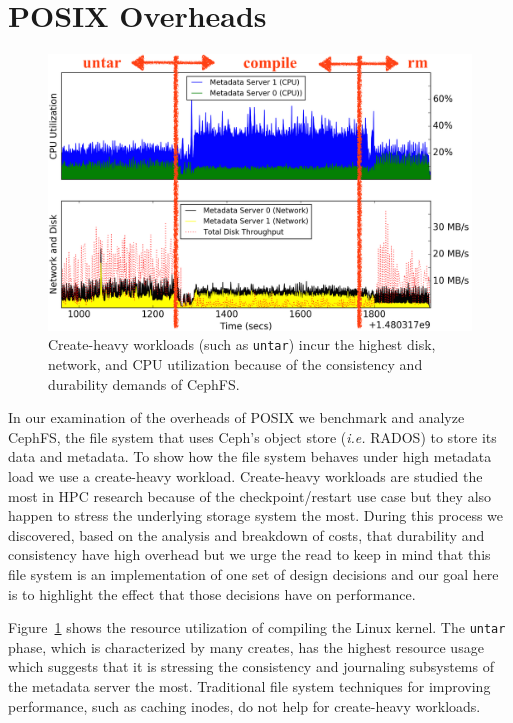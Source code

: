 \section{POSIX Overheads}
\label{sec:posix-overheads}

\begin{figure}[tb]
\centering
\includegraphics[width=1\linewidth]{./graphs/overhead-creates.png}
\caption{Create-heavy workloads (such as \texttt{untar}) incur the highest disk, network, and
CPU utilization because of the consistency and durability demands of
CephFS.}\label{fig:overhead-creates}
\end{figure}

In our examination of the overheads of POSIX we benchmark and analyze CephFS,
the file system that uses Ceph's object store ({\it i.e.} RADOS) to store its
data and metadata. To show how the file system behaves under high metadata load
we use a create-heavy workload. Create-heavy workloads are studied the most in
HPC research because of the checkpoint/restart use case but they also happen to
stress the underlying storage system the most.  During this process we
discovered, based on the analysis and breakdown of costs, that durability and
consistency have high overhead but we urge the read to keep in mind that this
file system is an implementation of one set of design decisions and our goal
here is to highlight the effect that those decisions have on performance.

Figure~\ref{fig:overhead-creates} shows the resource utilization of compiling
the Linux kernel.  The \texttt{untar} phase, which is characterized by many
creates, has the highest resource usage which suggests that it is stressing the
consistency and journaling subsystems of the metadata server the most.
Traditional file system techniques for improving performance, such as caching
inodes, do not help for create-heavy workloads.

